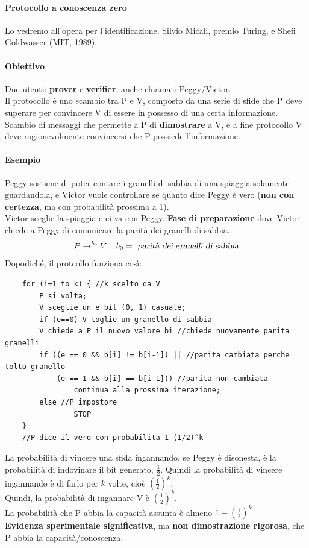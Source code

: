 \documentclass[10pt]{book}
\begin{document}
\paragraph{Protocollo a conoscenza zero} Lo vedremo all'opera per l'identificazione. Silvio Micali, premio Turing, e Shefi Goldwasser (MIT, 1989).
\paragraph{Obiettivo} Due utenti: \textbf{prover} e \textbf{verifier}, anche chiamati Peggy/Victor.\\
Il protocollo è uno scambio tra P e V, composto da una serie di sfide che P deve superare per convincere V di essere in possesso di una certa informazione. Scambio di messaggi che permette a P di \textbf{dimostrare} a V, e a fine protocollo V deve ragionevolmente convincersi che P possiede l'informazione.
\paragraph{Esempio} Peggy sostiene di poter contare i granelli di sabbia di una spiaggia solamente guardandola, e Victor vuole controllare se quanto dice Peggy è vero (\textbf{non con certezza}, ma con probabilità prossima a 1).\\
Victor sceglie la spiaggia e ci va con Peggy. \textbf{Fase di preparazione} dove Victor chiede a Peggy di comunicare la parità dei granelli di sabbia.
$$P \rightarrow^{b_0} V\:\:\:\:\:b_0 =\textsl{ parità dei granelli di sabbia}$$
\pagebreak
Dopodiché, il protcollo funziona così:
\begin{lstlisting}
	for (i=1 to k) { //k scelto da V
		P si volta;
		V sceglie un e bit (0, 1) casuale;
		if (e==0) V toglie un granello di sabbia
		V chiede a P il nuovo valore bi //chiede nuovamente parita granelli
		if ((e == 0 && b[i] != b[i-1]) || //parita cambiata perche tolto granello
			(e == 1 && b[i] == b[i-1])) //parita non cambiata
				continua alla prossima iterazione;
		else //P impostore
				STOP
	}
	//P dice il vero con probabilita 1-(1/2)^k
\end{lstlisting}
La probabilità di vincere una sfida ingannando, se Peggy è disonesta, è la probabilità di indovinare il bit generato, $\frac{1}{2}$. Quindi la probabilità di vincere ingannando è di farlo per $k$ volte, cioè $\left(\frac{1}{2}\right)^k$.\\
Quindi, la probabilità di ingannare V è $\left(\frac{1}{2}\right)^k$.\\
La probabilità che P abbia la capacità assunta è almeno $1-\left(\frac{1}{2}\right)^k$\\
\textbf{Evidenza sperimentale significativa}, ma \textbf{non dimostrazione rigorosa}, che P abbia la capacità/conoscenza.
\end{document}
